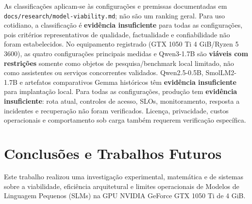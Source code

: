 \documentclass[10pt,a4paper,twocolumn]{article}
\begin{document}
As classifica\c{c}\~oes aplicam-se \`as configura\c{c}\~oes e premissas documentadas em \texttt{docs/research/model-viability.md}; n\~ao s\~ao um ranking geral. Para uso cotidiano, a classifica\c{c}\~ao \'e \textbf{evid\^encia insuficiente} para todas as configura\c{c}\~oes, pois crit\'erios representativos de qualidade, factualidade e confiabilidade n\~ao foram estabelecidos. No equipamento registrado (GTX 1050 Ti 4 GiB/Ryzen 5 3600), as quatro configura\c{c}\~oes principais medidas e Qwen3-1.7B s\~ao \textbf{vi\'aveis com restri\c{c}\~oes} somente como objetos de pesquisa/benchmark local limitado, n\~ao como assistentes ou servi\c{c}os concorrentes validados. Qwen2.5-0.5B, SmolLM2-1.7B e artefatos comparativos Gemma hist\'oricos t\^em \textbf{evid\^encia insuficiente} para implanta\c{c}\~ao local. Para todas as configura\c{c}\~oes, produ\c{c}\~ao tem \textbf{evid\^encia insuficiente}: rota atual, controles de acesso, SLOs, monitoramento, resposta a incidentes e recupera\c{c}\~ao n\~ao foram verificados. Licen\c{c}a, privacidade, custos operacionais e comportamento sob carga tamb\'em requerem verifica\c{c}\~ao espec\'ifica.

\section{Conclus\~oes e Trabalhos Futuros}

Este trabalho realizou uma investiga\c{c}\~ao experimental, matem\'atica e de sistemas sobre a viabilidade, efici\^encia arquitetural e limites operacionais de Modelos de Linguagem Pequenos (SLMs) na GPU NVIDIA GeForce GTX 1050 Ti de 4 GiB.
\end{document}

